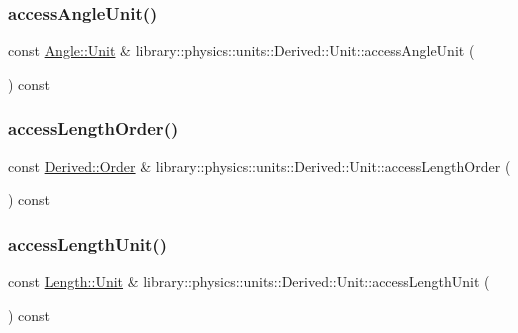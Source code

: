 \subsubsection{\texorpdfstring{access\+Angle\+Unit()}{accessAngleUnit()}}
{\footnotesize\ttfamily const \hyperlink{classlibrary_1_1physics_1_1units_1_1_angle_a3c329d415a61783b16ce481874cc5956}{Angle\+::\+Unit} \& library\+::physics\+::units\+::\+Derived\+::\+Unit\+::access\+Angle\+Unit (\begin{DoxyParamCaption}{ }\end{DoxyParamCaption}) const}

\mbox{\label{classlibrary_1_1physics_1_1units_1_1_derived_1_1_unit_ae7afd674029bece3fa430f96d378472f}} 
\subsubsection{\texorpdfstring{access\+Length\+Order()}{accessLengthOrder()}}
{\footnotesize\ttfamily const \hyperlink{classlibrary_1_1physics_1_1units_1_1_derived_1_1_order}{Derived\+::\+Order} \& library\+::physics\+::units\+::\+Derived\+::\+Unit\+::access\+Length\+Order (\begin{DoxyParamCaption}{ }\end{DoxyParamCaption}) const}

\mbox{\label{classlibrary_1_1physics_1_1units_1_1_derived_1_1_unit_a39a4cbff8b3e4347a4744e788198ad4d}} 
\subsubsection{\texorpdfstring{access\+Length\+Unit()}{accessLengthUnit()}}
{\footnotesize\ttfamily const \hyperlink{classlibrary_1_1physics_1_1units_1_1_length_a3b8b39cd245cf6b19dc34459baeccb18}{Length\+::\+Unit} \& library\+::physics\+::units\+::\+Derived\+::\+Unit\+::access\+Length\+Unit (\begin{DoxyParamCaption}{ }\end{DoxyParamCaption}) const}

